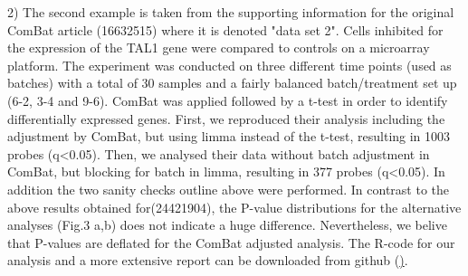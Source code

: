 \documentclass{bio}
\begin{document}

2) The second example is taken from the supporting information for the original ComBat article (16632515) where it is denoted "data set 2". Cells inhibited for the expression of the TAL1 gene were compared to controls on a microarray platform. The experiment was conducted on three different time points (used as batches) with a total of 30 samples and a fairly balanced batch/treatment set up (6-2, 3-4 and 9-6). ComBat was applied followed by a t-test in order to identify differentially expressed genes. First, we reproduced their analysis including the adjustment by ComBat, but using limma instead of the t-test, resulting in 1003 probes (q<0.05).  Then, we analysed their data without batch adjustment in ComBat, but blocking for batch in limma, resulting in 377 probes (q<0.05). In addition the two sanity checks outline above were performed. In contrast to the above results obtained for(24421904), the P-value distributions for the alternative analyses (Fig.3 a,b) does not indicate a huge difference. Nevertheless, we belive that  P-values are deflated for the ComBat adjusted analysis. The R-code for our analysis and a more extensive report can be downloaded from github (\href{https://github.com/vegardny/combat_tests.git}).

\end{document}
